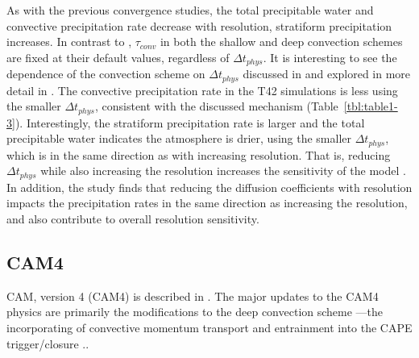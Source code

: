 As with the previous convergence studies, the total precipitable water and convective precipitation rate decrease with resolution, stratiform precipitation increases. In contrast to \cite{WETAL1995CD}, $\tau_{conv}$ in both the shallow and deep convection schemes are fixed at their default values, regardless of $\Delta t_{phys}$. It is interesting to see the dependence of the convection scheme on $\Delta t_{phys}$ discussed in \cite{WETAL1995CD} and explored in more detail in \cite{W2013QJRMS}. The convective precipitation rate in the T42 simulations is less using the smaller $\Delta t_{phys}$, consistent with the discussed mechanism (Table~\ref{tbl:table1-3}). Interestingly, the stratiform precipitation rate is larger and the total precipitable water indicates the atmosphere is drier, using the smaller $\Delta t_{phys}$, which is in the same direction as with increasing resolution. That is, reducing $\Delta t_{phys}$ while also increasing the resolution increases the sensitivity of the model \citep{W2008TELLUS}. In addition, the study finds that reducing the diffusion coefficients with resolution impacts the precipitation rates in the same direction as increasing the resolution, and also contribute to overall resolution sensitivity.
 
\subsection{CAM4}

CAM, version 4 (CAM4) is described in \cite{CAM4}. The major updates to the CAM4 physics are primarily the modifications to the deep convection scheme \citep{ZM1995AO} ---the incorporating of convective momentum transport \citep{RR2008JC} and entrainment into the CAPE trigger/closure \citep{RB1992JAS,NRJ2008JC}..

